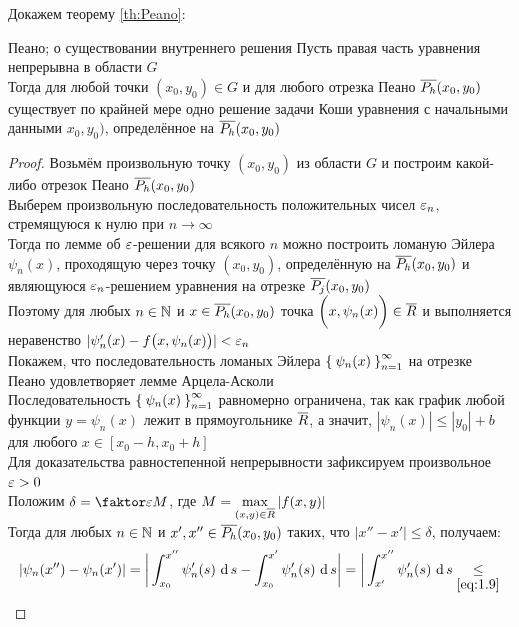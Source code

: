 Докажем теорему \ref{th:Peano}:

\begin{theorem}{Пеано; о существовании внутреннего решения}
    Пусть правая часть уравнения  непрерывна в области $ G $ \\
    Тогда для любой точки $ (x_0, y_0) \in G $ и для любого отрезка Пеано $ \overline{P_h}(x_0, y_0) $ существует по крайней мере одно решение задачи Коши уравнения  с начальными данными $ x_0, y_0) $, определённое на $ \overline{P_h}(x_0, y_0) $
\end{theorem}

\begin{proof}
    Возьмём произвольную точку $ (x_0, y_0) $ из области $ G $ и построим какой-либо отрезок Пеано $ \overline{P_h}(x_0, y_0) $ \\
    Выберем произвольную последовательность положительных чисел $ \varepsilon_n $, стремящуюся к нулю при $ n \to \infty $ \\
    Тогда по лемме об $ \varepsilon $-решении для всякого $ n $ можно построить ломаную Эйлера $ \psi_n(x) $, проходящую через точку $ (x_0, y_0) $, определённую на $ \overline{P_h}(x_0, y_0) $ и являющуюся $ \varepsilon_n $-решением уравнения  на отрезке $ \overline{P_j}(x_0, y_0) $ \\
    Поэтому для любых $ n \in \mathbb{N} $ и $ x \in \overline{P_h}(x_0, y_0) $ точка $ \bigg( x, \psi_n(x) \bigg) \in \overline{R} $ и выполняется неравенство  $ |\psi_n'(x) - f \big( x, \psi_n(x) \big) | < \varepsilon_n $ \\
    Покажем, что последовательность ломаных Эйлера $ \Set{\psi_n(x)}_{n=1}^{\infty} $ на отрезке Пеано удовлетворяет лемме Арцела-Асколи \\
    Последовательность $ \Set{\psi_n(x)}_{n=1}^{\infty} $ равномерно ограничена, так как график любой функции $ y = \psi_n(x) $ лежит в прямоугольнике $ \overline{R} $, а значит, $ |\psi_n(x)| \le |y_0| + b $ для любого $ x \in [x_0 - h, x_0 + h] $ \\
    Для доказательства равностепенной непрерывности зафиксируем произвольное $ \varepsilon > 0 $ \\
    Положим $ \delta = \faktor\veps{M} $, где $ M = \max\limits_{(x, y) \in \overline{R}}|f(x, y)| $ \\
    Тогда для любых $ n \in \mathbb{N} $ и $ x', x'' \in \overline{P_h}(x_0, y_0) $ таких, что $ |x'' - x'| \le \delta $, получаем:
    \begin{multline*}
        |\psi_n(x'') - \psi_n(x')| = \bigg| \dint[s]{x_0}{x''}{\psi_n'(s)} - \dint[s]{x_0}{x'}{\psi_n'(s)} \bigg| = \bigg| \dint[s]{x'}{x''}{\psi_n'(s)} \underset{\eref{1.9}}\le \\

\end{multline*}
\end{proof}
